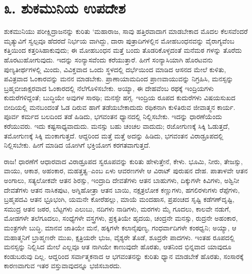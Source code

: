 
\chapter{೩. ಶುಕಮುನಿಯ ಉಪದೇಶ}

ಶುಕಮುನಿಯು ಪರೀಕ್ಷಿದ್ರಾಜನನ್ನು ಕುರಿತು ‘ಮಹಾರಾಜ, ಸಾವು ಹತ್ತಿರವಾದಾಗ ಮಾಡಬೇಕಾದ ಮೊದಲ ಕೆಲಸವೆಂದರೆ ಮೃತ್ಯುವಿಗೆ ಸ್ವಲ್ಪವೂ ಹೆದರದೆ ನಿರ್ಭಯ ವಾಗಿದ್ದು, ದಾರಾ ಪುತ್ರಾದಿಗಳಲ್ಲಿನ ಮೋಹಬಂಧನವನ್ನು ವೈರಾಗ್ಯವೆಂಬ ಕತ್ತಿಯಿಂದ ಕತ್ತರಿಸಿಹಾಕುವುದು; ಈ ಮೋಹಬಂಧನ ಮತ್ತೆ ಬಂದು ತೊಡರಿಕೊಳ್ಳದಂತೆ ಮನೆಮಠ ಗಳನ್ನು ತೊರೆದು ಹೊರಟುಹೋಗುವುದು. ಇದನ್ನು ಸಂನ್ಯಾಸವೆಂದು ಕರೆಯುತ್ತಾರೆ. ಹೀಗೆ ಸಂನ್ಯಾಸಿಯಾಗಿ ಹೊರಟವನು ಪುಣ್ಯತೀರ್ಥಗಳಲ್ಲಿ ಮಿಂದು, ವಿವಿಕ್ತವಾದ ಒಂದು ಸ್ಥಳದಲ್ಲಿ ದರ್ಭೆಯಿಂದ ಮಾಡಿದ ಆಸನದ ಮೇಲೆ ಕುಳಿತು, ಪವಿತ್ರವಾದ ಓಂಕಾರವನ್ನು ಮನನ ಮಾಡಬೇಕು. ಪ್ರಾಣಾಯಾಮದಿಂದ ಪ್ರಾಣವಾಯುವನ್ನು ನಿಗ್ರಹಿಸಿ, ಮನಸ್ಸನ್ನು ಬ್ರಹ್ಮಬೀಜಾಕ್ಷರವಾದ ಓಂಕಾರದಲ್ಲಿ ನೆಲೆಗೊಳಿಸಬೇಕು. ಅಯ್ಯಾ, ಈ ದೇಹವೆಂಬ ರಥಕ್ಕೆ ಇಂದ್ರಿಯಗಳು ಕುದುರೆಗಳಿದ್ದಂತೆ; ಬುದ್ಧಿಯೇ ಅವುಗಳ ಸಾರಥಿ; ಮನಸ್ಸೇ ಹಗ್ಗ. ಇಂದ್ರಿಯ ರೂಪದ ಕುದುರೆಗಳು ವಿಷಯಸುಖದ ಬೀದಿಯಲ್ಲಿ ಮನಬಂದಂತೆ ಓಡ ದಿರುವ ಹಾಗೆ ತಡೆಯಬೇಕಾದುದು ರಥಿಕನಾಗಿ ಕುಳಿತಿರುವ ಜೀವಾತ್ಮನ ಕಾರ್ಯ. ಪೂರ್ವ ಕರ್ಮದ ಬಲದಿಂದ ತಡೆ ಹಿಡಿದು, ಭಗವಂತನ ಧ್ಯಾನದಲ್ಲಿ ನಿಲ್ಲಿಸಬೇಕು. ಇದನ್ನು ಧಾರಣೆಯೆಂದು ಕರೆಯುವರು. ಇದು ಕಷ್ಟಸಾಧ್ಯವಾದುದು. ಮನಸ್ಸು ಬಹು ಚಂಚಲ ವಾದುದು; ರಜೋಗುಣಕ್ಕೆ ಸಿಕ್ಕಿ ಓಡುತ್ತದೆ, ತಮೋಗುಣಕ್ಕೆ ಸಿಕ್ಕಿ ಮಂಕಾಗುತ್ತದೆ. ಆದ್ದರಿಂದ ಮತ್ತೆ ಮತ್ತೆ ಅದನ್ನು ಹಿಡಿದು, ಭಗವಂತನ ವಿರಾಡ್ರೂಪದಲ್ಲಿ ನಿಲ್ಲಿಸಬೇಕು. ಹೀಗೆ ಮಾಡಿದ ಯೋಗಿಗೆ ಭಕ್ತಿಯೋಗ ಕರಗತವಾಗುತ್ತದೆ.

ರಾಜ! ಧಾರಣೆಗೆ ಆಧಾರವಾದ ವಿರಾಡ್ರೂಪದ ಸ್ವರೂಪವನ್ನು ಕುರಿತು ಹೇಳುತ್ತೇನೆ, ಕೇಳು. ಭೂಮಿ, ನೀರು, ತೇಜಸ್ಸು, ವಾಯು, ಆಕಾಶ, ಅಹಂಕಾರ, ಮಹತ್ತತ್ವ–ಎಂಬ ಏಳು ಆವರಣಗಳೇ ಆ ವಿರಾಟ್ ಪುರುಷನ ದೇಹ. ಪಾತಾಳವೇ ಆತನ ಅಂಗಾಲು, ಸತ್ಯಲೋಕವೇ ಆತನ ಶಿರಸ್ಸು, ಇಂದ್ರಾದಿ ದೇವತೆಗಳು ಆತನ ಬಾಹುಗಳು, ದಿಕ್ಕುಗಳೇ ಕಿವಿಗಳು, ಅಶ್ವಿನೀ ದೇವತೆಗಳು ಆತನ ನಾಸಿಕಪುಟ, ಅಗ್ನಿಹೋತ್ರಾ ಆತನ ಬಾಯಿ, ನಕ್ಷತ್ರಲೋಕ ಕಣ್ಣುಗಳು, ಹಗಲಿರಳುಗಳು ರೆಪ್ಪೆಗಳು, ಬ್ರಹ್ಮಪದವಿ ಆತನ ಭ್ರೂಭಂಗಿ, ಯಮನೇ ಕೋರೆಹಲ್ಲು, ಮಾಯೆ ಮಂದಹಾಸ, ಪ್ರಪಂಚದ ಸೃಷ್ಟಿ ಕಡೆಗಣ್​ದೃಷ್ಟಿ, ಸಮುದ್ರ ಆತನ ಜಠರ, ಬೆಟ್ಟಗಳು ಎಲುಬು, ನದಿಗಳು ನಾಡಿಗಳು, ಮರಗಳು ಮೈ ಗೂದಲು, ಕಾಲವೇ ನಡುಗೆ, ಮೋಡಗಳೇ ತಲೆಗೂದಲು, ಸಂಧ್ಯೆಗಳೇ ವಸ್ತ್ರಗಳು, ಪ್ರಕೃತಿಯೇ ಹೃದಯ, ಚಂದ್ರನೇ ಮನಸ್ಸು, ರುದ್ರನೇ ಅಹಂಕಾರ, ಮಂತ್ರಗಳೇ ಬುದ್ಧಿ, ಮಾನವ ಜಾತಿಯೇ ಮನೆ, ಹಕ್ಕಿಗಳೇ ಕಲಾನೈಪುಣ್ಯ, ಗಂಧರ್ವಾದಿಗಳೇ ಕಂಠಧ್ವನಿ; ಅಯ್ಯಾ, ಆ ಮಹಾತ್ಮನಿಗೆ ಬ್ರಾಹ್ಮಣರೇ ಮುಖ, ಕ್ಷತ್ರಿಯರೇ ಭುಜ, ವೈಶ್ಯರೇ ತೊಡೆ, ಶೂದ್ರರೇ ಪಾದಗಳು. ಇಂತಹ ರೂಪದಲ್ಲಿ ಮನಸ್ಸನ್ನು ನಿಲ್ಲಿಸಿದ ಮೇಲೆ ಎಲ್ಲವೂ ಆತ ನಾಗಿಯೇ ಕಾಣುವುದೇ ಹೊರತು, ಆತನಿಂದ ಭಿನ್ನವಾದ ಯಾವುದೂ ಕಂಡುಬರುವು ದಿಲ್ಲ. ಆದ್ದರಿಂದ ಸರ್ವಾತ್ಮಕನಾದ ಆ ಭಗವಂತನನ್ನು ಕುರಿತು ಧ್ಯಾನ ಮಾಡಬೇಕೆ ಹೊರತು, ಸಂಸಾರಕ್ಕೆ ಕಾರಣವಾಗುವ ಇತರ ವಸ್ತುವಾವುದನ್ನೂ ಭಜಿಸಬಾರದು.

